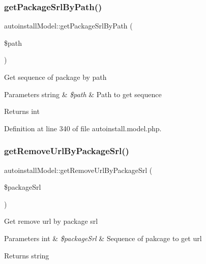 \mbox{\label{classautoinstallModel_a7344733b35feec3a7bcc8a1440d2e682}} 
\subsubsection{\texorpdfstring{get\+Package\+Srl\+By\+Path()}{getPackageSrlByPath()}}
{\footnotesize\ttfamily autoinstall\+Model\+::get\+Package\+Srl\+By\+Path (\begin{DoxyParamCaption}\item[{}]{\$path }\end{DoxyParamCaption})}

Get sequence of package by path


\begin{DoxyParams}[1]{Parameters}
string & {\em \$path} & Path to get sequence \\
\hline
\end{DoxyParams}
\begin{DoxyReturn}{Returns}
int 
\end{DoxyReturn}


Definition at line 340 of file autoinstall.\+model.\+php.

\mbox{\label{classautoinstallModel_aa2b3fa8f08e15bfb1a9a061aca6dfa8c}} 
\subsubsection{\texorpdfstring{get\+Remove\+Url\+By\+Package\+Srl()}{getRemoveUrlByPackageSrl()}}
{\footnotesize\ttfamily autoinstall\+Model\+::get\+Remove\+Url\+By\+Package\+Srl (\begin{DoxyParamCaption}\item[{}]{\$package\+Srl }\end{DoxyParamCaption})}

Get remove url by package srl


\begin{DoxyParams}[1]{Parameters}
int & {\em \$package\+Srl} & Sequence of pakcage to get url \\
\hline
\end{DoxyParams}
\begin{DoxyReturn}{Returns}
string 
\end{DoxyReturn}


